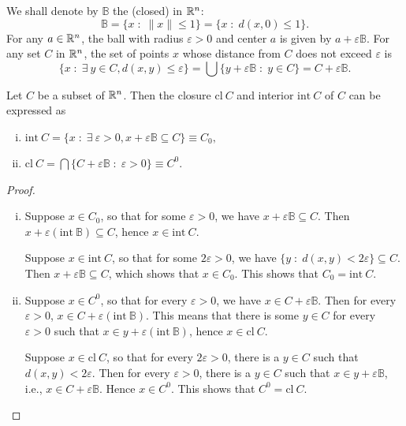 \documentclass[11pt,a4paper]{article}
\begin{document}
We shall denote by $\mathbb{B}$ the (closed)  in $\mathbb{R}^n$:
\begin{equation*}
    \mathbb{B} = \{x\;:\;\|x\|\le 1\} = \{x\;:\; d(x,0)\le 1\}.
\end{equation*}
For any $a\in \mathbb{R}^n$, the ball with radius $\varepsilon>0$ and center $a$ is given by $a+\varepsilon \mathbb{B}$. For any set $C$ in $\mathbb{R}^n$, the set of points $x$ whose distance from $C$ does not exceed $\varepsilon$ is 
\begin{equation*}
    \{x\;:\;\exists\ y\in C, d(x,y)\le \varepsilon\} = \bigcup \{y+\varepsilon \mathbb{B}\;:\;y\in C\} = C + \varepsilon \mathbb{B}.
\end{equation*}

\begin{proposition}\label{prop:closure_interior_formulae}
    Let $C$ be a subset of $\mathbb{R}^n$. Then the closure $\mathrm{cl}\ C$ and interior $\mathrm{int}\ C$ of $C$ can be expressed as 
    \begin{enumerate}[(i)]
        \item $\mathrm{int}\ C = \{x\;:\; \exists\ \varepsilon>0,x+\varepsilon \mathbb{B}\subseteq C\}\equiv C_0,$ 
        \item $\mathrm{cl}\ C = \bigcap \{C+\varepsilon \mathbb{B}\;:\; \varepsilon>0\} \equiv C^0$. 
    \end{enumerate}
\end{proposition}

\begin{proof}
    \begin{enumerate}[(i)]
        \item \converse Suppose $x\in C_0$, so that for some $\varepsilon >0$, we have $x+\varepsilon\mathbb{B} \subseteq C$. Then $x+\varepsilon (\mathrm{int}\ \mathbb{B})\subseteq C$, hence $x\in \mathrm{int}\ C$. 

        \forward Suppose $x\in \mathrm{int}\ C$, so that for some $2 \varepsilon > 0$, we have $\{y\;:\;d(x,y)<2\varepsilon\}\subseteq C$. Then $x+\varepsilon \mathbb{B}\subseteq C$, which shows that $x\in C_0$. This shows that $C_0 = \mathrm{int}\ C$.

        \item \converse Suppose $x\in C^0$, so that for every $\varepsilon>0$, we have $x\in C+\varepsilon \mathbb{B}$. Then for every $\varepsilon>0$, $x\in C+\varepsilon (\mathrm{int}\ \mathbb{B})$. This means that there is some $y\in C$ for every $\varepsilon>0$ such that $x\in y+\varepsilon(\mathrm{int}\ \mathbb{B})$, hence $x\in \mathrm{cl}\ C$.

        \forward Suppose $x\in \mathrm{cl}\ C$, so that for every $2\varepsilon>0$, there is a $y\in C$ such that $d(x,y)<2\varepsilon$. Then for every $\varepsilon>0$, there is a $y\in C$ such that $x\in y+\varepsilon\mathbb{B}$, i.e., $x\in C+\varepsilon\mathbb{B}$. Hence $x\in C^0$. This shows that $C^0 = \mathrm{cl}\ C$.    
    \end{enumerate}
\end{proof}
\end{document}
